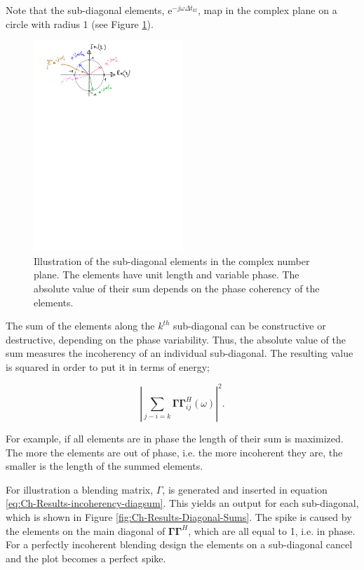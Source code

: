 Note that the sub-diagonal elements, $\mathrm{e}^{-j \omega \Delta t_{kl}}$, map in the complex plane on a circle with radius 1 (see Figure \ref{fig:Ch-Results-complex-circle}). 

\begin{figure}
	\centering
	\includegraphics[width = 0.5\textwidth]{Plots/complex-circle}
	\caption{Illustration of the sub-diagonal elements in the complex number plane. The elements have unit length and variable phase. The absolute value of their sum depends on the phase coherency of the elements.}
	\label{fig:Ch-Results-complex-circle}
\end{figure}

The sum of the elements along the $k^{th}$ sub-diagonal can be constructive or destructive, depending on the phase variability. Thus, the absolute value of the sum measures the incoherency of an individual sub-diagonal. The resulting value is squared in order to put it in terms of energy;

\begin{equation}
	\left| \sum_{j-i=k} \mathbf{\Gamma \Gamma}^H_{ij} (\omega) \right|^2.
	\label{eq:Ch-Results-incoherency-diagsum}	
\end{equation} 

For example, if all elements are in phase the length of their sum is maximized. The more the elements are out of phase, i.e. the more incoherent they are, the smaller is the length of the summed elements. 

For illustration a blending matrix, $\Gamma$, is generated and inserted in equation \ref{eq:Ch-Results-incoherency-diagsum}. This yields an output for each sub-diagonal, which is shown in Figure \ref{fig:Ch-Results-Diagonal-Sums}. The spike is caused by the elements on the main diagonal of $\mathbf{\Gamma \Gamma}^H$, which are all equal to 1, i.e. in phase. For a perfectly incoherent blending design the elements on a sub-diagonal cancel and the plot becomes a perfect spike. 


